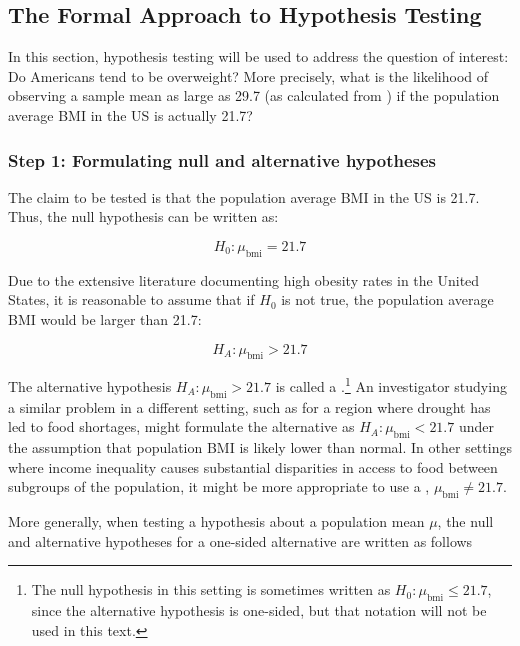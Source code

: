 \begin{spacing}{1.5}

\subsection{The Formal Approach to Hypothesis Testing}
\label{formalHypothesisTesting}

In this section, hypothesis testing will be used to address the question of interest: Do Americans tend to be overweight? More precisely, what is the likelihood of observing a sample mean as large as 29.7 (as calculated from ) if the population average BMI in the US is actually 21.7?

\subsubsection{Step 1: Formulating null and alternative hypotheses}

The claim to be tested is that the population average BMI in the US is 21.7. Thus, the null hypothesis can be written as:

\[H_0: \mu_{\text{bmi}} = 21.7\]

Due to the extensive literature documenting high obesity rates in the United States, it is reasonable to assume that if $H_0$ is not true, the population average BMI would be larger than 21.7: 

\[H_A: \mu_{\text{bmi}} > 21.7\]

The alternative hypothesis $H_A: \mu_{\text{bmi}} > 21.7$ is called a .\footnote{The null hypothesis in this setting is sometimes written as $H_0: \mu_{\text{bmi}} \leq 21.7$, since the alternative hypothesis is one-sided, but that notation will not be used in this text.} An investigator studying a similar problem in a different setting, such as for a region where drought has led to food shortages, might formulate the alternative as $ H_A:\mu_{\text{bmi}} < 21.7$ under the assumption that population BMI is likely lower than normal. In other settings where income inequality causes substantial disparities in access to food between subgroups of the population, it might be more appropriate to use a , $\mu_{\text{bmi}} \neq 21.7$. 

More generally, when testing a hypothesis about a population mean $\mu$, the null and alternative hypotheses for a one-sided alternative are written as follows


\end{spacing}
